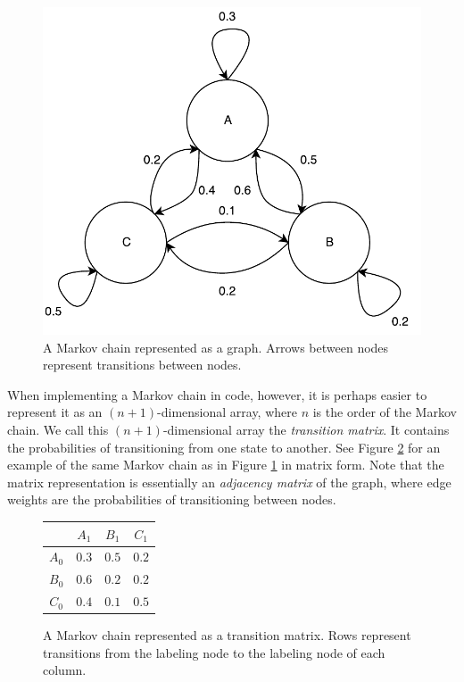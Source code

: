\begin{figure}[h]
	\centering
	\includegraphics[width=\linewidth]{figures/markovGraph.pdf}
	\caption[A Markov chain represented as a graph.]{A Markov chain represented as a graph. Arrows between nodes represent transitions between nodes.}
	\label{fig:markovGraph}
\end{figure}

When implementing a Markov chain in code, however, it is perhaps easier to represent it as an $(n + 1)$-dimensional array, where $n$ is the order of the Markov chain.
We call this $(n + 1)$-dimensional array the \textit{transition matrix}.
It contains the probabilities of transitioning from one state to another.
See Figure \ref{fig:markovMatrix} for an example of the same Markov chain as in Figure \ref{fig:markovGraph} in matrix form.
Note that the matrix representation is essentially an \textit{adjacency matrix} of the graph, where edge weights are the probabilities of transitioning between nodes.

\begin{figure}[h]
	\centering
	\begin{tabular}{c | c c c}
		& $A_{1}$ & $B_{1}$ & $C_{1}$\\
		\hline
		$A_{0}$ & $0.3$ & $0.5$ & $0.2$\\
		$B_{0}$ & $0.6$ & $0.2$ & $0.2$\\
		$C_{0}$ & $0.4$ & $0.1$ & $0.5$
	\end{tabular}
	\caption[A Markov chain represented as a transition matrix.]{A Markov chain represented as a transition matrix. Rows represent transitions from the labeling node to the labeling node of each column.}
	\label{fig:markovMatrix}
\end{figure}


